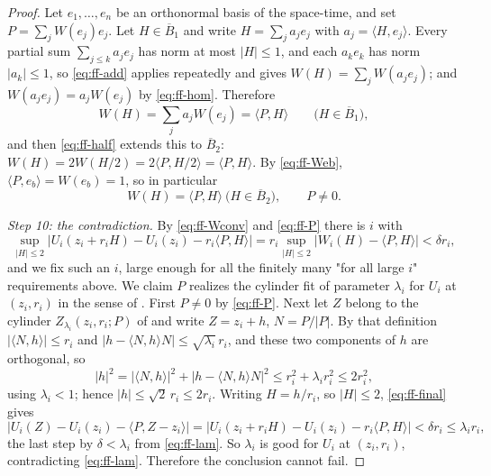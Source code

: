 \begin{proof}
Let $e_1,\dots,e_n$ be an orthonormal basis of the space-time, and set
$P=\sum_{j}W(e_j)e_j$. Let $H\in\overline B_1$ and write
$H=\sum_ja_je_j$ with $a_j=\langle H,e_j\rangle$. Every partial sum
$\sum_{j\le k}a_je_j$ has norm at most $|H|\le1$, and each $a_ke_k$ has norm
$|a_k|\le1$, so \eqref{eq:ff-add} applies repeatedly and gives
$W(H)=\sum_jW(a_je_j)$; and $W(a_je_j)=a_jW(e_j)$ by \eqref{eq:ff-hom}.
Therefore
\[
  W(H)=\sum_ja_jW(e_j)=\langle P,H\rangle\qquad\bigl(H\in\overline B_1\bigr),
\]
and then \eqref{eq:ff-half} extends this to $\overline B_2$:
$W(H)=2W(H/2)=2\langle P,H/2\rangle=\langle P,H\rangle$. By
\eqref{eq:ff-Web}, $\langle P,e_b\rangle=W(e_b)=1$, so in particular
\begin{equation}\label{eq:ff-P}
  W(H)=\langle P,H\rangle\ \bigl(H\in\overline B_2\bigr),\qquad P\ne0 .
\end{equation}

\emph{Step 10: the contradiction.}
By \eqref{eq:ff-Wconv} and \eqref{eq:ff-P} there is $i$ with
\begin{equation}\label{eq:ff-final}
  \sup_{|H|\le2}\bigl|U_i(z_i+r_iH)-U_i(z_i)-r_i\langle P,H\rangle\bigr|
   =r_i\sup_{|H|\le2}\bigl|W_i(H)-\langle P,H\rangle\bigr|<\delta r_i ,
\end{equation}
and we fix such an $i$, large enough for all the finitely many "for all large
$i$" requirements above. We claim $P$ realizes the cylinder fit of parameter
$\lambda_i$ for $U_i$ at $(z_i,r_i)$ in the sense of .
First $P\ne0$ by \eqref{eq:ff-P}. Next let $Z$ belong to the cylinder
$Z_{\lambda_i}(z_i,r_i;P)$ of  and write $Z=z_i+h$,
$N=P/|P|$. By that definition $|\langle N,h\rangle|\le r_i$ and
$|h-\langle N,h\rangle N|\le\sqrt{\lambda_i}\,r_i$, and these two components of
$h$ are orthogonal, so
\[
  |h|^2=|\langle N,h\rangle|^2+|h-\langle N,h\rangle N|^2
   \le r_i^2+\lambda_ir_i^2\le2r_i^2 ,
\]
using $\lambda_i<1$; hence $|h|\le\sqrt2\,r_i\le2r_i$. Writing $H=h/r_i$, so
$|H|\le2$, \eqref{eq:ff-final} gives
\[
  \bigl|U_i(Z)-U_i(z_i)-\langle P,Z-z_i\rangle\bigr|
   =\bigl|U_i(z_i+r_iH)-U_i(z_i)-r_i\langle P,H\rangle\bigr|
   <\delta r_i\le\lambda_ir_i ,
\]
the last step by $\delta<\lambda_i$ from \eqref{eq:ff-lam}. So $\lambda_i$ is
good for $U_i$ at $(z_i,r_i)$, contradicting \eqref{eq:ff-lam}. Therefore the
conclusion cannot fail.
\end{proof}
